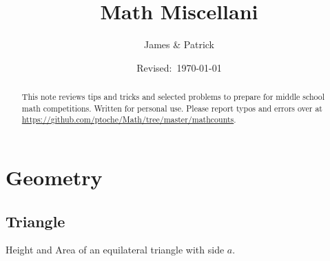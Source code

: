 \documentclass[12pt]{article}
\title{Math Miscellani}
\author{James \& Patrick}
\date{Revised:~\today}
\begin{document}
\maketitle
\begin{minipage}{\textwidth}
\begin{abstract}\setlength{\parindent}{0pt}%
This note reviews tips and tricks and selected problems to prepare for middle school math competitions. Written for personal use. Please report typos and errors over at \url{https://github.com/ptoche/Math/tree/master/mathcounts}. 
\end{abstract}
\end{minipage}

\thispagestyle{empty}
\clearpage
\addtocounter{page}{-1}

\section*{Geometry}

\subsection*{Triangle}
Height and Area of an equilateral triangle with side $a$.
\end{document}
